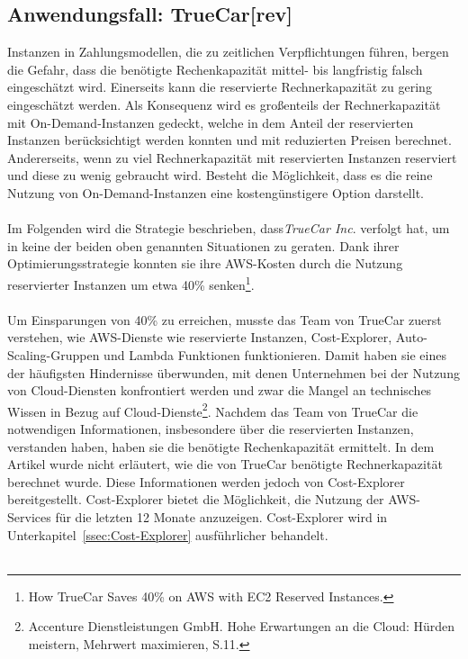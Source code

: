 \subsection{Anwendungsfall: TrueCar[rev]}\label{ssec:UseCaseTrueCar}
Instanzen in Zahlungsmodellen, die zu zeitlichen Verpflichtungen führen, bergen die Gefahr, dass die benötigte Rechenkapazität mittel- bis langfristig falsch eingeschätzt wird. Einerseits kann die reservierte Rechnerkapazität zu gering eingeschätzt werden. Als Konsequenz wird es großenteils der Rechnerkapazität mit On-Demand-Instanzen gedeckt, welche in dem Anteil der reservierten Instanzen berücksichtigt werden konnten und mit reduzierten Preisen berechnet. Andererseits, wenn zu viel Rechnerkapazität mit reservierten Instanzen reserviert und diese zu wenig gebraucht wird. Besteht die Möglichkeit, dass es die reine Nutzung von On-Demand-Instanzen eine kostengünstigere Option darstellt.
\\\\
Im Folgenden wird die Strategie beschrieben, dass\textit{TrueCar Inc}. verfolgt hat, um in keine der beiden oben genannten Situationen zu geraten. Dank ihrer Optimierungsstrategie konnten sie ihre AWS-Kosten durch die Nutzung reservierter Instanzen um etwa 40\% senken\footnote{How TrueCar Saves 40\% on AWS with EC2 Reserved Instances\cite{MED1}.}.
\\\\
Um Einsparungen von 40\% zu erreichen, musste das Team von TrueCar zuerst verstehen, wie AWS-Dienste wie reservierte Instanzen, Cost-Explorer, Auto-Scaling-Gruppen und Lambda Funktionen funktionieren. Damit haben sie eines der häufigsten Hindernisse überwunden, mit denen Unternehmen bei der Nutzung von Cloud-Diensten konfrontiert werden und zwar die Mangel an technisches Wissen in Bezug auf Cloud-Dienste\footnote{Accenture Dienstleistungen GmbH. Hohe Erwartungen an die Cloud: Hürden meistern, Mehrwert maximieren, S.11\cite{ACC1}.}. Nachdem das Team von TrueCar die notwendigen Informationen, insbesondere über die reservierten Instanzen, verstanden haben, haben sie die benötigte Rechenkapazität ermittelt. In dem Artikel wurde nicht erläutert, wie die von TrueCar benötigte Rechnerkapazität berechnet wurde. Diese Informationen werden jedoch von Cost-Explorer bereitgestellt. Cost-Explorer bietet die Möglichkeit, die Nutzung der AWS-Services für die letzten 12 Monate anzuzeigen. Cost-Explorer wird in Unterkapitel~\ref{ssec:Cost-Explorer} ausführlicher behandelt.
\\\\
